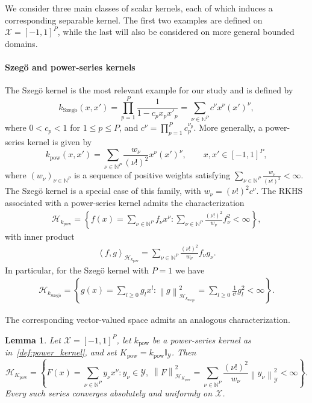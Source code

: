 \documentclass[11pt]{article}
\numberwithin{equation}{section}
\theoremstyle{plain}
\newtheorem{lemma}[theorem]{Lemma}
\theoremstyle{definition}
\theoremstyle{remark}
\newcommand{\X}{\mathcal{X}}
\newcommand{\Hs}{\mathcal{H}}
\newcommand{\Y}{\mathcal{Y}}
\newcommand{\I}{\mathbb{I}}
\newcommand{\norm}[1]{\left\lVert#1\right\rVert}
\newcommand{\innerpro}[1]{\left\langle#1\right\rangle}
\begin{document}
We consider three main classes of scalar kernels, each of which induces a
corresponding separable kernel. The first two examples are defined on
$\X=[-1,1]^P$, while the last will also be considered on more general bounded
domains.

\paragraph{Szegö and power-series kernels}

The Szegö kernel is the most relevant example for our study and is defined by
\begin{equation}\label{eq:def_Szeg}
k_{\mathrm{Szeg\ddot{o}}}(x,x')
=
\prod_{p=1}^P\frac{1}{1-c_px_px'_p}
=
\sum_{\nu\in\mathbb{N}^P}
c^\nu x^\nu (x')^\nu,
\end{equation}
where $0<c_p<1$ for $1\leq p\leq P$, and $c^\nu=\prod_{p=1}^Pc_p^{\nu_p}$. More generally, a power-series kernel is
given by
\begin{equation}\label{def:power_kernel}
k_{\mathrm{pow}}(x,x')
=
\sum_{\nu\in\mathbb{N}^P}
\frac{w_\nu}{(\nu!)^2}x^\nu(x')^\nu,
\qquad
x,x'\in[-1,1]^P,
\end{equation}
where $(w_\nu)_{\nu\in\mathbb{N}^P}$ is a sequence of positive weights
satisfying
\(
\sum_{\nu\in\mathbb{N}^P}
\frac{w_\nu}{(\nu!)^2}<\infty.
\)
The Szegö kernel is a special case of this family, with
$w_\nu=(\nu!)^2c^\nu$. The RKHS associated with a power-series kernel admits
the characterization \cite{zwicknagl2009power}
\begin{align}\label{eq:pow_series_rkhs}
\Hs_{k_{\mathrm{pow}}}
=
\left\{
f(x)=\sum_{\nu\in\mathbb{N}^P}f_\nu x^\nu:
\sum_{\nu\in\mathbb{N}^P}
\frac{(\nu!)^2}{w_\nu}f_\nu^2<\infty
\right\},
\end{align}
with inner product
\begin{align*}
\innerpro{f,g}_{\Hs_{k_{\mathrm{pow}}}}
=
\sum_{\nu\in\mathbb{N}^P}
\frac{(\nu!)^2}{w_\nu}f_\nu g_\nu.
\end{align*}
In particular, for the Szegö kernel with
$P=1$ we have
\begin{align}\label{eq:szeg_rkhs_1d}
\Hs_{k_{\mathrm{Szeg\ddot{o}}}}
=
\left\{
g(x)=\sum_{l\geq0}g_lx^l:
\norm{g}_{\Hs_{k_{\mathrm{Szeg\ddot{o}}}}}^2
=
\sum_{l\geq0}\frac{1}{c^l}g_l^2<\infty
\right\}.
\end{align}

The corresponding vector-valued space admits an analogous
characterization.

\begin{lemma}
\label{lem:power_series_vrkhs}
Let $\X=[-1,1]^P$, let $k_{\mathrm{pow}}$ be a power-series
kernel as in~\eqref{def:power_kernel}, and set
$K_{\mathrm{pow}}=k_{\mathrm{pow}}\I_{\Y}$. Then
\begin{equation}\label{eq:pow_series_vrkhs}
\Hs_{K_{\mathrm{pow}}}
=
\left\{
F(x)=\sum_{\nu\in\mathbb{N}^P}y_\nu x^\nu:
y_\nu\in\Y,\;\norm{F}_{\Hs_{K_{\mathrm{pow}}}}^2=\sum_{\nu\in\mathbb{N}^P}
\frac{(\nu!)^2}{w_\nu}\norm{y_\nu}_{\Y}^2<\infty
\right\}.
\end{equation}
Every such series converges absolutely
and uniformly on $\X$.
\end{lemma}
\end{document}
